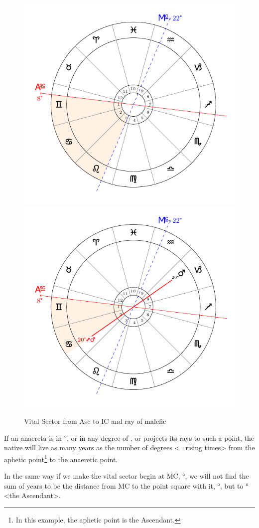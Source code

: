 \begin{figure}[H]
\includegraphics[width=.5\textwidth]{charts/3_03_1}\includegraphics[width=.5\textwidth]{charts/3_03_1a}
\caption{Vital Sector from Asc to IC and ray of malefic}
\end{figure}

If an anaereta is in \Gemini\xspace 20°, or in any degree of \Cancer, or projects its rays to such a point, the native will live as many years as the number of degrees <=rising times> from the aphetic point\footnote{In this example, the aphetic point is the Ascendant.} to the anaeretic point. 

In the same way if we make the vital sector begin at MC, \Aquarius\xspace 22°, we will not find the sum of years to be the distance from MC to the point square with it, \Taurus\xspace 22°, but to \Gemini\xspace 8° <the Ascendant>. 

